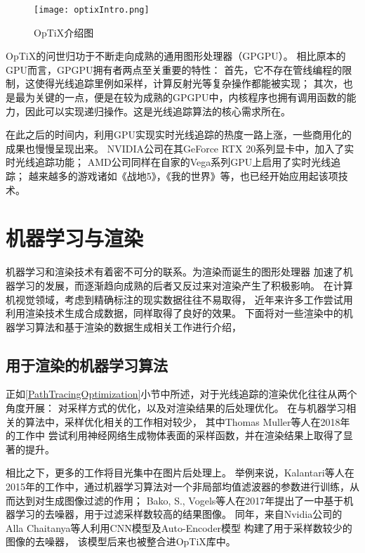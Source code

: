 \begin{figure}
    \centering
    \texttt{[image: optixIntro.png]}
    \caption{OpTiX介绍图}
    \label{tab:optixRender}
\end{figure}

OpTiX的问世归功于不断走向成熟的通用图形处理器（GPGPU）。
相比原本的GPU而言，GPGPU拥有者两点至关重要的特性：
首先，它不存在管线编程的限制，这使得光线追踪里例如采样，计算反射光等复杂操作都能被实现；
其次，也是最为关键的一点，便是在较为成熟的GPGPU中，内核程序也拥有调用函数的能力，因此可以实现递归操作。这是光线追踪算法的核心需求所在。

在此之后的时间内，利用GPU实现实时光线追踪的热度一路上涨，一些商用化的成果也慢慢呈现出来。
NVIDIA公司在其GeForce RTX 20系列显卡中，加入了实时光线追踪功能\cite{RTXOn}；
AMD公司同样在自家的Vega系列GPU上启用了实时光线追踪\cite{Vega}；
越来越多的游戏诸如《战地5》，《我的世界》等，也已经开始应用起该项技术。 

\section{机器学习与渲染}

机器学习和渲染技术有着密不可分的联系。为渲染而诞生的图形处理器
加速了机器学习的发展，而逐渐趋向成熟的后者又反过来对渲染产生了积极影响。
在计算机视觉领域，考虑到精确标注的现实数据往往不易取得，
近年来许多工作尝试用利用渲染技术生成合成数据，同样取得了良好的效果。
下面将对一些渲染中的机器学习算法和基于渲染的数据生成相关工作进行介绍，

\subsection{用于渲染的机器学习算法}

\label{MLDenoiser}
正如\ref{PathTracingOptimization}小节中所述，对于光线追踪的渲染优化往往从两个角度开展：
对采样方式的优化，以及对渲染结果的后处理优化。
在与机器学习相关的算法中，采样优化相关的工作相对较少，
其中Thomas Muller等人在2018年的工作\cite{Mller2018NeuralIS}中
尝试利用神经网络生成物体表面的采样函数，并在渲染结果上取得了显著的提升。

相比之下，更多的工作将目光集中在图片后处理上。
举例来说，Kalantari等人在2015年的工作中\cite{kalantari2015machine}，通过机器学习算法对一个非局部均值滤波器的参数进行训练，从而达到对生成图像过滤的作用；
Bako, S., Vogels等人在2017年提出了一中基于机器学习的去噪器\cite{bako2017kernel}，用于过滤采样数较高的结果图像。
同年，\label{AIDnoiser}来自Nvidia公司的Alla Chaitanya等人利用CNN模型及Auto-Encoder模型
构建了用于采样数较少的图像的去噪器\cite{chaitanya2017interactive}，
该模型后来也被整合进OpTiX库中。

